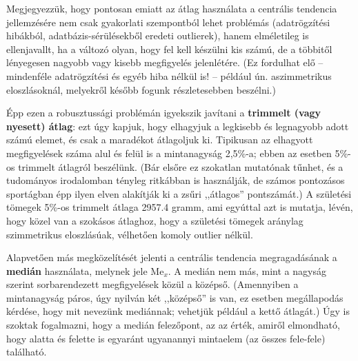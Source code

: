 \documentclass[
]{book}
\begin{document}
Megjegyezzük, hogy pontosan emiatt az átlag használata a centrális tendencia jellemzésére nem csak gyakorlati szempontból lehet problémás (adatrögzítési hibákból, adatbázis-sérülésekből eredeti outlierek), hanem elméletileg is ellenjavallt, ha a változó olyan, hogy fel kell készülni kis számú, de a többitől lényegesen nagyobb vagy kisebb megfigyelés jelenlétére. (Ez fordulhat elő -- mindenféle adatrögzítési és egyéb hiba nélkül is! -- például ún. aszimmetrikus eloszlásoknál, melyekről később fogunk részletesebben beszélni.)

Épp ezen a robusztussági problémán igyekszik javítani a \textbf{trimmelt (vagy nyesett) átlag}: ezt úgy kapjuk, hogy elhagyjuk a legkisebb és legnagyobb adott számú elemet, és csak a maradékot átlagoljuk ki. Tipikusan az elhagyott megfigyelések száma alul és felül is a mintanagyság 2,5\%-a; ebben az esetben 5\%-os trimmelt átlagról beszélünk. (Bár elsőre ez szokatlan mutatónak tűnhet, és a tudományos irodalomban tényleg ritkábban is használják, de számos pontozásos sportágban épp ilyen elven alakítják ki a zsűri ,,átlagos'' pontszámát.) A születési tömegek 5\%-os trimmelt átlaga 2957.4 gramm, ami egyúttal azt is mutatja, lévén, hogy közel van a szokásos átlaghoz, hogy a születési tömegek aránylag szimmetrikus eloszlásúak, vélhetően komoly outlier nélkül.

Alapvetően más megközelítését jelenti a centrális tendencia megragadásának a \textbf{medián} használata, melynek jele \(\mathrm{Me}_x\). A medián nem más, mint a nagyság szerint sorbarendezett megfigyelések közül a középső. (Amennyiben a mintanagyság páros, úgy nyilván két ,,középső'' is van, ez esetben megállapodás kérdése, hogy mit nevezünk mediánnak; vehetjük például a kettő átlagát.) Úgy is szoktak fogalmazni, hogy a medián felezőpont, az az érték, amiről elmondható, hogy alatta és felette is egyaránt ugyanannyi mintaelem (az összes fele-fele) található.
\end{document}
